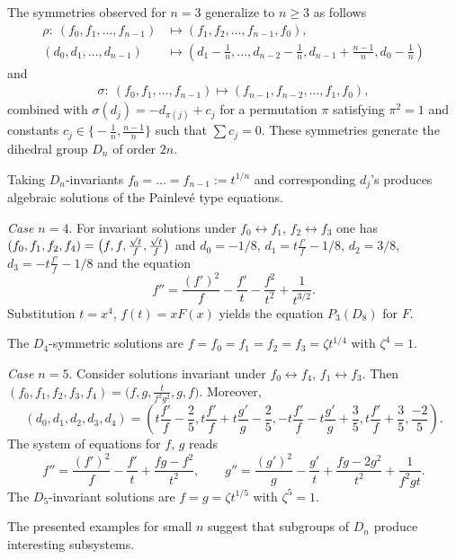 \documentclass[10pt,a4paper]{amsart}
\numberwithin{equation}{section}
\begin{document}
 The symmetries observed for $n=3$ generalize to $n\geq 3$ as follows
\begin{align*}
\rho\colon\ (f_0, f_1,\dots, f_{n-1})
& \mapsto (f_1,f_2,\dots , f_{n-1},f_0),\\
(d_0,d_1,\dots, d_{n-1})& \mapsto \left(d_1-\frac1n, \dots,d_{n-2}-\frac1n,d_{n-1}+\frac{n-1}{n}, d_0-\frac1n\right)
\end{align*}
and
\begin{gather*}
\sigma\colon\ (f_0, f_1,\dots, f_{n-1})
\mapsto (f_{n-1}, f_{n-2},\dots, f_1, f_0),
\end{gather*}
combined with $\sigma(d_j)=-d_{\pi(j)}+c_j$ for a permutation $\pi$ satisfying $\pi^2=1$ and constants $c_j\in\bigl\{-\frac1n,\frac{n-1}{n}\bigr\}$
such that $\sum c_j=0$. These symmetries generate the dihedral group $D_n$ of order $2n$.

Taking $D_n$-invariants $f_0=\dots=f_{n-1}:=t^{1/n}$ and corresponding $d_j$'s produces algebraic solutions of the Painlev\'{e} type equations.



 {\it Case $n=4$}. For invariant solutions under
 $f_0\leftrightarrow f_1$, $f_2\leftrightarrow f_3$
 one has $(f_0,f_1,f_2,f_4)=\smash{\bigl(f,f,\frac{\sqrt{t}}{f}, \frac{\sqrt{t}}{f}\bigr)}$ and
 $d_0=-1/8$, $d_1=t\frac{f'}{f}-1/8$, $d_2=3/8$, $d_3=-t\frac{f'}{f}-1/8$ and the equation
 \[ f''=\frac{(f')^2}{f}-\frac{f'}{t}-\frac{f^2}{t^2}+\frac{1}{t^{3/2}}.\]
 Substitution $t=x^4$, $f(t)=xF(x)$ yields the equation $P_3(D_8)$ for $F$.

 The $D_4$-symmetric solutions are
 $f=f_0=f_1=f_2=f_3=\zeta t^{1/4}$ with $\zeta^4=1$.


 {\it Case $n=5$}. Consider solutions invariant under
 $f_0 \leftrightarrow f_4$, $f_1\leftrightarrow f_3$. Then
 $(f_0,f_1,f_2,f_3,f_4)=\bigl(f,g,\frac{t}{f^2g^2},g,f\bigr)$. Moreover,
 \[
 (d_0,d_1,d_2,d_3,d_4)=
\left(t\frac{f'}{f}-\frac25, t\frac{f'}{f}+t\frac{g'}{g}-\frac25, -t\frac{f'}{f}-t\frac{g'}{g}+\frac35, t\frac{f'}{f}+\frac35, \frac{-2}{5} \right).\]
The system of equations for $f$, $g$ reads
\[f''=\frac{(f')^2}{f}-\frac{f'}{t}+\frac{fg-f^2}{t^2},\qquad g''=\frac{(g')^2}{g}-\frac{g'}{t}+\frac{fg-2g^2}{t^2}+\frac{1}{f^2gt}. \]
The $D_5$-invariant solutions are $f=g=\zeta t^{1/5}$ with $\zeta^5=1$.

The presented examples for small $n$ suggest that
subgroups of $D_n$ produce interesting subsystems.
\end{document}
